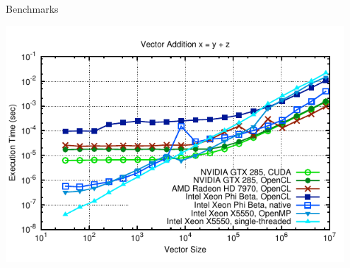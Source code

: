 









\begin{frame}{Benchmarks}
  \begin{center}
   \includegraphics[width=0.95\textwidth]{figures/vector-timings-7}
  \end{center}
\end{frame}


